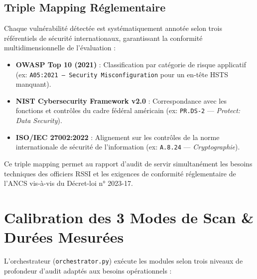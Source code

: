 \subsection{Triple Mapping Réglementaire}
Chaque vulnérabilité détectée est systématiquement annotée selon trois référentiels de sécurité internationaux, garantissant la conformité multidimensionnelle de l'évaluation :
\begin{itemize}
    \item \textbf{OWASP Top 10 (2021)} : Classification par catégorie de risque applicatif (ex: \texttt{A05:2021 — Security Misconfiguration} pour un en-tête HSTS manquant).
    \item \textbf{NIST Cybersecurity Framework v2.0} : Correspondance avec les fonctions et contrôles du cadre fédéral américain (ex: \texttt{PR.DS-2} — \textit{Protect: Data Security}).
    \item \textbf{ISO/IEC 27002:2022} : Alignement sur les contrôles de la norme internationale de sécurité de l'information (ex: \texttt{A.8.24} — \textit{Cryptographie}).
\end{itemize}
Ce triple mapping permet au rapport d'audit de servir simultanément les besoins techniques des officiers RSSI et les exigences de conformité réglementaire de l'ANCS vis-à-vis du Décret-loi n° 2023-17.

\section{Calibration des 3 Modes de Scan \& Durées Mesurées}
L'orchestrateur (\texttt{orchestrator.py}) exécute les modules selon trois niveaux de profondeur d'audit adaptés aux besoins opérationnels :

